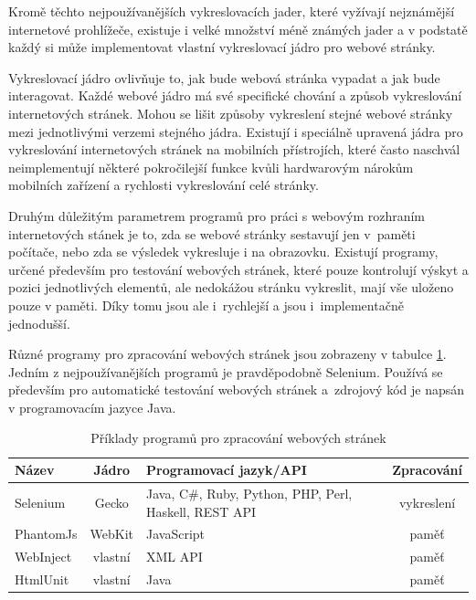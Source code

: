 \documentclass[thesis=M,czech]{FITthesis}[2013/05/10]
\begin{document}
Kromě těchto nejpoužívanějších vykreslovacích jader, které vyžívají nejznámější internetové prohlížeče, existuje i velké množství méně známých jader a v podstatě každý si může implementovat vlastní vykreslovací jádro pro webové stránky.

Vykreslovací jádro ovlivňuje to, jak bude webová stránka vypadat a jak bude interagovat. Každé webové jádro má své specifické chování a způsob vykreslování internetových stránek. Mohou se lišit způsoby vykreslení stejné webové stránky mezi jednotlivými verzemi stejného jádra. Existují i speciálně upravená jádra pro vykreslování internetových stránek na mobilních přístrojích, které často naschvál neimplementují některé pokročilejší funkce kvůli hardwarovým nárokům mobilních zařízení a rychlosti vykreslování celé stránky.

Druhým důležitým parametrem programů pro práci s webovým rozhraním internetových stánek je to, zda se webové stránky sestavují jen v~paměti počítače, nebo zda se výsledek vykresluje i na obrazovku. Existují programy, určené především pro testování webových stránek, které pouze kontrolují výskyt a pozici jednotlivých elementů, ale nedokážou stránku vykreslit, mají vše uloženo pouze v paměti. Díky tomu jsou ale i~rychlejší a jsou i~implementačně jednodušší. 

Různé programy pro zpracování webových stránek jsou zobrazeny v tabulce \ref{tab:web-engines}. Jedním z nejpoužívanějších programů je pravděpodobně Selenium. Používá se především pro automatické testování webových stránek a~zdrojový kód je napsán v programovacím jazyce Java. 

\begin{table}[h]
\centering
\caption{Příklady programů pro zpracování webových stránek}\label{tab:web-engines}
\begin{tabular}{| l | c | p{5cm} | c |}
	\hline
	\textbf{Název} & 
	\textbf{Jádro} & 
	\textbf{Programovací jazyk/API} & 
	\textbf{Zpracování} \\ \hline
	
	Selenium & %
	Gecko & 
	Java, C\#, Ruby, Python, PHP, Perl, Haskell, REST API & 
	vykreslení \\ \hline
	
	PhantomJs & %
	WebKit & 
	JavaScript & 
	paměť \\ \hline
	
	WebInject & %
	vlastní &
	XML API &
	paměť \\ \hline
	
	HtmlUnit & %
	vlastní &
	Java &
	paměť \\ \hline
\end{tabular}
\end{table}
\end{document}
